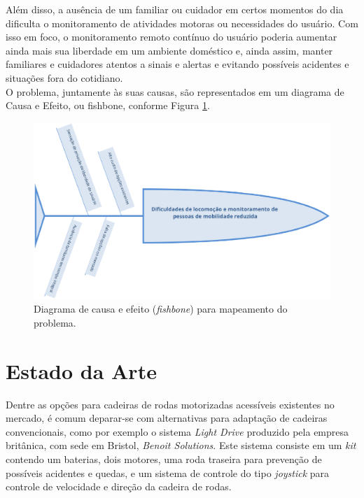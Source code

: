 Além disso, a ausência de um familiar ou cuidador em certos momentos 
do dia 
dificulta o monitoramento de atividades motoras ou necessidades 
do usuário. 
Com isso em foco, o monitoramento remoto contínuo do usuário 
poderia 
aumentar ainda mais sua liberdade em um ambiente doméstico e, ainda 
assim, 
manter familiares e cuidadores atentos a sinais e alertas e evitando 
possíveis 
acidentes e situações fora do cotidiano.\\
	
O problema, juntamente às suas causas, são representados em um diagrama 
de Causa e Efeito, ou fishbone, conforme Figura \ref{fishbone}.
	
\begin{figure}[h]
    \centering
    \label{fishbone}
    \includegraphics[scale=0.5]{figuras/fishboneUMISS.eps}
    \caption{Diagrama de causa e efeito (\textit{fishbone}) para mapeamento do problema.}
\end{figure}


\section{Estado da Arte}

Dentre as opções para cadeiras de rodas motorizadas acessíveis existentes no mercado,
é comum deparar-se com alternativas para adaptação de cadeiras convencionais,
como por exemplo o sistema \textit{Light Drive} produzido pela empresa britânica, 
com sede em Bristol, \textit{Benoit Solutions}. Este sistema consiste em um \textit{kit}
contendo um baterias, dois motores, uma roda traseira para prevenção de possíveis
acidentes e quedas, e um sistema de controle do tipo \textit{joystick}
para controle de velocidade e direção da cadeira de rodas.\\

